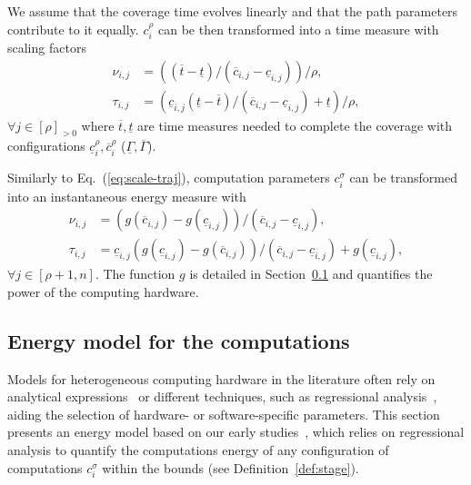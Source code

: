 \documentclass[letterpaper,10pt,journal,twoside]{IEEEtran}
\theoremstyle{definition}
\begin{document}
{\color{blue}W}e assume that the coverage time evolves linearly{ \color{blue}and that the }path parameters{ \color{blue}contribute to it equally.} $c_i^\rho$ can be {\color{blue}then} transformed into a time measure with scaling factors\begin{subequations}\label{eq:scale-traj}\begin{align}
  \nu_{i,j}&=\left((\overline{t}-\underline{t})/(\overline{c}_{i,j}-\underline{c}_{i,j})\right)/\rho,\\
  \tau_{i,j}&=\left(\underline{c}_{i,j}(\underline{t}-\overline{t})/(\overline{c}_{i,j}-\underline{c}_{i,j})+\underline{t}\right)/\rho,
\end{align}\end{subequations} 
$\forall j\in[\rho]_{>0}$ where $\overline{t},\underline{t}$ are time measures needed to complete the coverage with configurations $\underline{c}_i^\rho,\overline{c}_i^\rho$ ($\underline{\Gamma},\overline{\Gamma}$).

Similarly to Eq.~(\ref{eq:scale-traj}), computation parameters $c_i^\sigma$ can be transformed into an instantaneous energy measure with %
\begin{subequations}\label{eq:scale-comp}\begin{align}
  \nu_{i,j}&=(g(\overline{c}_{i,j})-g(\underline{c}_{i,j}))/(\overline{c}_{i,j}-\underline{c}_{i,j}),\\
  \tau_{i,j}&=\underline{c}_{i,j}(g(\underline{c}_{i,j})-g(\overline{c}_{i,j}))/(\overline{c}_{i,j}-\underline{c}_{i,j})+g(\underline{c}_{i,j}),
\end{align}\end{subequations}
$\forall j\in[\rho+1,n]$. The function $g$ is detailed in Section~\ref{sec:mod-com} and quantifies the power of the computing hardware.

\subsection{Energy model for the computations}
\label{sec:mod-com}

Models for heterogeneous computing hardware in the literature often rely on analytical expressions~\cite{marowka2017energy,%
yang2017designing} or different techniques, such as regressional analysis~\cite{bailey2014adaptive,ma2012holistic,seewald2019coarse}, aiding the selection of hardware- or software-specific parameters. This section presents an energy model based on our early studies~\cite{seewald2019component,seewald2019coarse}, which relies on regressional analysis to quantify the computations energy of any configuration of computations $c_i^\sigma$ within the bounds (see Definition~\ref{def:stage}).
\end{document}

